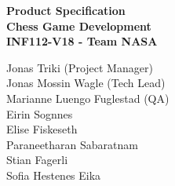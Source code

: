 \documentclass{article}
\begin{document}
	\begin{LARGE}\begin{center}
			\textbf{Product Specification\\
				Chess Game Development\\ 
				INF112-V18 - Team NASA}			
		\end{center}\end{LARGE}
	\vspace{5mm}
	
	\begin{center}
		Jonas Triki (Project Manager)\\
		Jonas Mossin Wagle (Tech Lead)\\
		Marianne Luengo Fuglestad (QA)\\
		Eirin Sognnes\\
		Elise Fiskeseth\\
		Paraneetharan Sabaratnam\\
		Stian Fagerli\\
		Sofia Hestenes Eika\\		
	\end{center}

\vspace{10mm}
\end{document}
